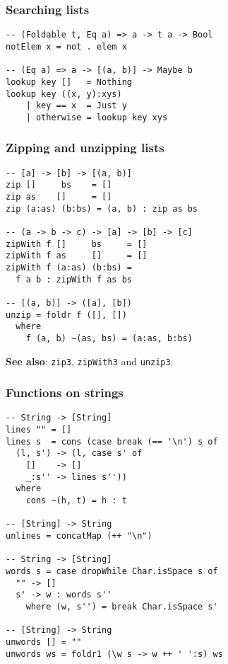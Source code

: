 \subsubsection{Searching lists}
\begin{verbatim}
-- (Foldable t, Eq a) => a -> t a -> Bool
notElem x = not . elem x

-- (Eq a) => a -> [(a, b)] -> Maybe b
lookup key []   = Nothing
lookup key ((x, y):xys)
    | key == x  = Just y
    | otherwise = lookup key xys
\end{verbatim}

\subsubsection{Zipping and unzipping lists}
\begin{verbatim}
-- [a] -> [b] -> [(a, b)]
zip []     bs    = []
zip as    []     = []
zip (a:as) (b:bs) = (a, b) : zip as bs

-- (a -> b -> c) -> [a] -> [b] -> [c]
zipWith f []     bs     = []
zipWith f as     []     = []
zipWith f (a:as) (b:bs) = 
  f a b : zipWith f as bs

-- [(a, b)] -> ([a], [b])
unzip = foldr f ([], [])
  where
    f (a, b) ~(as, bs) = (a:as, b:bs)
\end{verbatim}

\textbf{See also}: \texttt{zip3}, \texttt{zipWith3} and \texttt{unzip3}.

\subsubsection{Functions on strings}
\begin{verbatim}
-- String -> [String]
lines "" = []
lines s  = cons (case break (== '\n') s of
  (l, s') -> (l, case s' of
    []    -> []
    _:s'' -> lines s''))
  where
    cons ~(h, t) = h : t

-- [String] -> String
unlines = concatMap (++ "\n")

-- String -> [String]
words s = case dropWhile Char.isSpace s of
  "" -> []
  s' -> w : words s''
    where (w, s'') = break Char.isSpace s'

-- [String] -> String
unwords [] = ""
unwords ws = foldr1 (\w s -> w ++ ' ':s) ws
\end{verbatim}